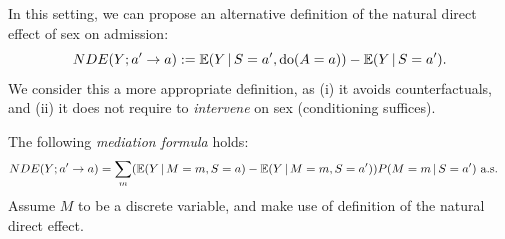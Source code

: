 In this setting, we can propose an alternative definition of the natural direct effect of sex on admission:
\begin{equation}\label{eq:nde_interventional}
 NDE(Y; a' \to a) := \mathbb{E}(Y \operatorname*{|} S=a', \operatorname{do}(A=a)) - \mathbb{E}(Y \operatorname*{|} S=a').
\end{equation}
We consider this a more appropriate definition, as (i) it avoids counterfactuals, and (ii) it does not require to \emph{intervene} on sex (conditioning suffices).

\begin{Prp}\label{prp:nde_mediation_formula}
The following \emph{mediation formula} holds:
  \begin{equation}\label{eq:nde_mediation_formula}\begin{split}
      NDE(Y; a' \to a)
      &= \sum_m (\mathbb{E}(Y \operatorname*{|} M=m, S=a) - \mathbb{E}(Y \operatorname*{|} M=m, S=a')) P(M=m \operatorname*{|} S=a') \text{ a.s.}
    \end{split}\end{equation}
  Assume $M$ to be a discrete variable, and make use of definition  of the natural direct effect.
\end{Prp}
